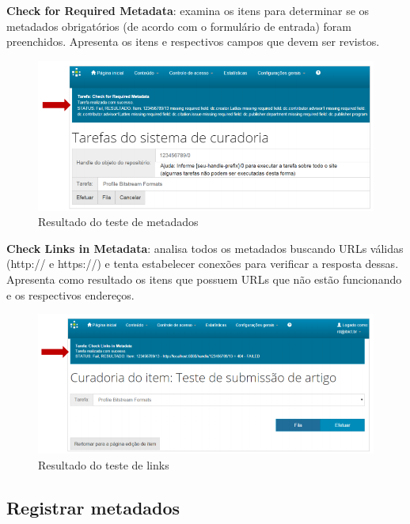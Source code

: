 \documentclass[12pt,hidelinks]{article}
\begin{document}
\newpage
    
    \textbf{Check for Required Metadata}: examina os itens para determinar se os metadados obrigatórios (de acordo com o formulário de entrada) foram preenchidos. Apresenta os itens e respectivos campos que devem ser revistos.
    
    \begin{figure}[!htp]
                \centering
                \includegraphics[scale=0.7]{figura/Figura123.png}
                \caption{Resultado do teste de metadados}
            \label{Rotulo}
        \end{figure}
    
    
    \textbf{Check Links in Metadata}: analisa todos os metadados buscando URLs válidas (http:// e https://) e tenta estabelecer conexões para verificar a resposta dessas. Apresenta como resultado os itens que possuem URLs que não estão funcionando e os respectivos endereços.
    
    \begin{figure}[!htp]
                \centering
                \includegraphics[scale=0.7]{figura/Figura124.png}
                \caption{Resultado do teste de links}
            \label{Rotulo}
        \end{figure}

\newpage
    
    \subsection{Registrar metadados}
    
\end{document}
